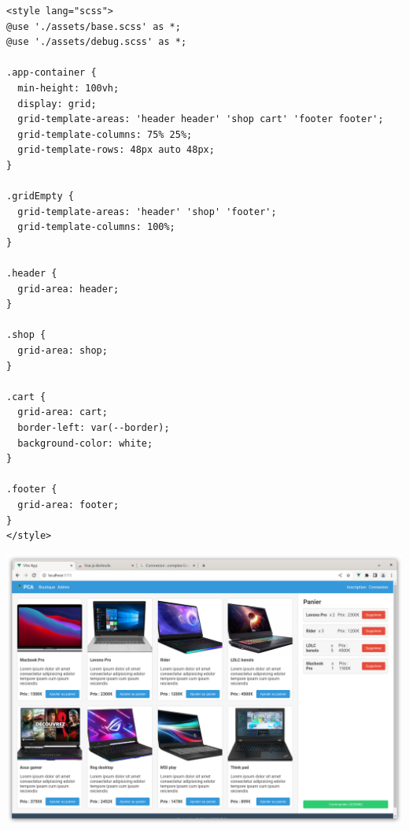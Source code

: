 \begin{verbatim}
<style lang="scss">
@use './assets/base.scss' as *;
@use './assets/debug.scss' as *;

.app-container {
  min-height: 100vh;
  display: grid;
  grid-template-areas: 'header header' 'shop cart' 'footer footer';
  grid-template-columns: 75% 25%;
  grid-template-rows: 48px auto 48px;
}

.gridEmpty {
  grid-template-areas: 'header' 'shop' 'footer';
  grid-template-columns: 100%;
}

.header {
  grid-area: header;
}

.shop {
  grid-area: shop;
}

.cart {
  grid-area: cart;
  border-left: var(--border);
  background-color: white;
}

.footer {
  grid-area: footer;
}
</style>
\end{verbatim}

\begin{center}
\includegraphics[width=15cm]{images/image24.png}
\end{center}